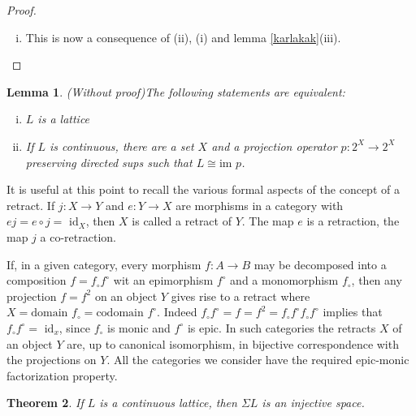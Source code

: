 \documentclass[a4paper,12pt]{article}
\newtheorem{theorem}{Theorem}[section]
\newtheorem{lemma}[theorem]{Lemma}
\begin{document}
\begin{proof}
\begin{enumerate}[(i)]
Let $W$ be a basic open set of $2^M$. By our description in the proof of (i), $W$ is determined by a finite number of coordinates $U_1,...,U_n \in M$. We have
$$j(x) \in W \iff x \in U_1 \cap ... \cap U_n;$$
whence, $j$ is continuous.

Let $V$ be any open subset of $X$. Then it is easy to see that 
$$j(V) = \{f \in \text{im } j: f(V) = 1 \}.$$
As this is the intersection of a basic open subset of $2^M$ with $\text{im } j$, this shows that $j$ is an embedding.
\item This is now a consequence of (ii), (i) and lemma \ref{karlakak}(iii).
\end{enumerate}
\end{proof}

\begin{lemma}\label{withoutproof}(Without proof)The following statements are equivalent:
\begin{enumerate}[(i)]
  \item $L$ is a lattice
  \item  If $L$ is continuous, there are a set $X$ and a projection operator $p: 2^X \to 2^X$ preserving directed sups such that $L \cong \text{im } p$.
\end{enumerate}

\end{lemma}

It is useful at this point to recall the various formal aspects of the concept of a retract. If $j: X \to Y$ and $e: Y \to X$ are morphisms in a category with $ej = e\circ j = \text{ id}_X$, then $X$ is called a retract of $Y$.  The map $e$ is a retraction, the map $j$ a co-retraction.

If, in a given category, every morphism $f: A \to B$ may be decomposed into a composition $f = f_\circ f^\circ$ wit an epimorphism $f^\circ$ and a monomorphism $f_\circ$, then any projection $f = f^2$ on an object $Y$ gives rise to a retract where $X = \text{domain }f_\circ = \text{codomain } f^\circ$. Indeed $f_\circ f^\circ = f = f^2 = f_\circ f^\circ f_\circ f^\circ$ implies that $f_\circ f^\circ = \text{ id}_x$, since $f_\circ$ is monic and $f^\circ$ is epic. In such categories the retracts $X$ of an object $Y$ are, up to canonical isomorphism, in bijective correspondence with the projections on $Y$. All the categories we consider have the required epic-monic factorization property.

\begin{theorem}\label{uwomgekeerde}
If $L$ is a continuous lattice, then $\Sigma L$ is an injective space.
\end{theorem}
\end{document}
